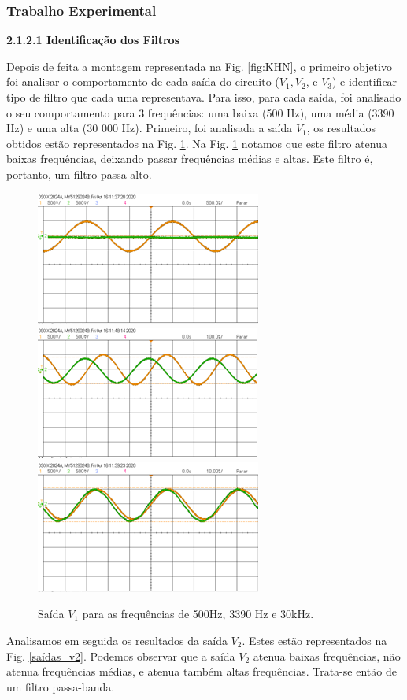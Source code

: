 \subsubsection{Trabalho Experimental}\label{sec:KNH_exp}
\vspace{2mm}
\noindent \textbf{2.1.2.1 \hspace{1mm}Identificação dos Filtros} \par
Depois de feita a montagem representada na Fig. \ref{fig:KHN}, o primeiro objetivo foi analisar o comportamento de cada saída do circuito ($V_1, V_2$, e $V_3$) e identificar tipo de filtro que cada uma representava. Para isso, para cada saída, foi analisado o seu comportamento para 3 frequências: uma baixa (500 Hz), uma média (3390 Hz) e uma alta (30 000 Hz). Primeiro, foi analisada a saída $V_1$, os resultados obtidos estão representados na Fig. \ref{saídas_v1}. Na Fig. \ref{saídas_v1} notamos que este filtro atenua baixas frequências, deixando passar frequências médias e altas. Este filtro é, portanto, um {filtro passa-alto}.

\begin{figure}[h!]
\centering
\includegraphics[width=.325\textwidth]{Imagens/v1_baixa_KNH.png}
\includegraphics[width=.325\textwidth]{Imagens/v1_media.png}
\includegraphics[width=.325\textwidth]{Imagens/v1_alta_KNH.png}
\caption{Saída $V_1$ para as frequências de 500Hz, 3390 Hz e 30kHz.}
\label{saídas_v1}
\end{figure}

Analisamos em seguida os resultados da saída $V_2$. Estes estão representados na Fig. \ref{saídas_v2}. Podemos observar que a saída $V_2$ atenua baixas frequências, não atenua frequências médias, e atenua também altas frequências. Trata-se então de um {filtro passa-banda}.

